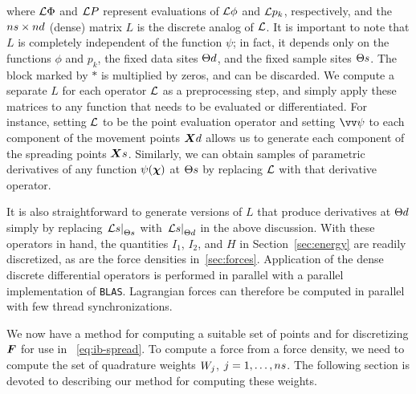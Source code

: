 where $\mathcal{L}\Phi$ and $\mathcal{L} P$ represent evaluations of $\mathcal{L}\phi$ and $\mathcal{L} p_k$, respectively, and the
$\sample\cardinality \times \data\cardinality$ (dense) matrix $L$ is the discrete analog of $\mathcal{L}$. It is important
to note that $L$ is completely independent of the function $\psi$; in fact, it depends only on the functions
$\phi$ and $p_k$, the fixed data sites $\data\sites$, and the fixed sample sites $\sample\sites$. The block marked
by $\ast$ is multiplied by zeros, and can be discarded. We compute a separate $L$ for each operator $\mathcal{L}$ as a
preprocessing step, and simply apply these matrices to any function that needs to be evaluated or differentiated.
For instance, setting $\mathcal{L}$ to be the point evaluation operator and setting $\arr{\psi}$ to each component of the
movement points $\data\X$ allows us to generate each component of the spreading points $\sample\X$.  Similarly, we
can obtain samples of parametric derivatives of any function $\psi(\boldsymbol{\chi})$ at $\sample\sites$ by replacing $\mathcal{L}$ with
that derivative operator.

It is also straightforward to generate versions of $L$ that produce derivatives at $\data\sites$ simply by
replacing $\left.\L s\right|_{\sample\sites}$ with $\left.\L s\right|_{\data\sites}$ in the above discussion. With
these operators in hand, the quantities $I_1$, $I_2$, and $H$ in Section~\ref{sec:energy} are readily discretized,
as are the force densities in~\ref{sec:forces}. Application of the dense discrete differential operators is
performed in parallel with a parallel implementation of \texttt{BLAS}. Lagrangian forces can therefore be computed
in parallel with few thread synchronizations.

We now have a method for computing a suitable set of points and for discretizing $\boldsymbol{F}$ for use in~%
\eqref{eq:ib-spread}. To compute a force from a force density, we need to compute the set of quadrature weights
$\weight[j]$, $j=1, \ldots, \sample\cardinality$. The following section is devoted to describing our method for
computing these weights.
